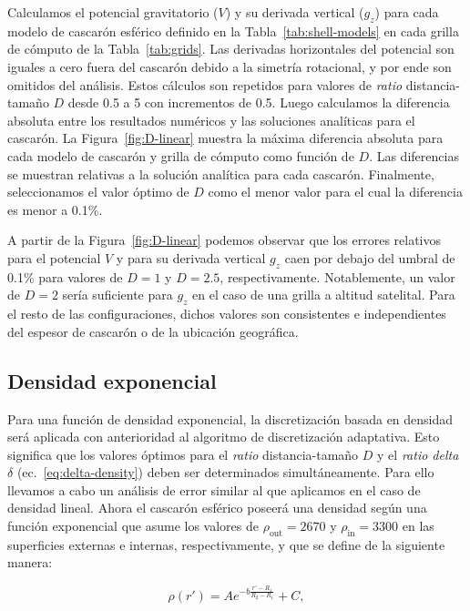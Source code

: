 Calculamos el potencial gravitatorio ($V$) y su derivada vertical ($g_z$)
para cada modelo de cascarón esférico definido en la
Tabla~\ref{tab:shell-models} en cada grilla de cómputo de la
Tabla~\ref{tab:grids}.
Las derivadas horizontales del potencial son iguales a cero fuera del cascarón
debido a la simetría rotacional, y por ende son omitidos del análisis.
Estos cálculos son repetidos para valores de \emph{ratio} distancia-tamaño $D$
desde 0.5 a 5 con incrementos de 0.5.
Luego calculamos la diferencia absoluta entre los resultados numéricos y las
soluciones analíticas para el cascarón.
La Figura~\ref{fig:D-linear} muestra la máxima diferencia absoluta para cada
modelo de cascarón y grilla de cómputo como función de $D$.
Las diferencias se muestran relativas a la solución analítica para cada
cascarón.
Finalmente, seleccionamos el valor óptimo de $D$ como el menor valor para el
cual la diferencia es menor a 0.1\%.

A partir de la Figura~\ref{fig:D-linear} podemos observar que los errores
relativos para el potencial $V$ y para su derivada vertical $g_z$ caen por
debajo del umbral de 0.1\% para valores de $D=1$ y $D=2.5$, respectivamente.
Notablemente, un valor de $D=2$ sería suficiente para $g_z$ en el caso de una
grilla a altitud satelital.
Para el resto de las configuraciones, dichos valores son consistentes
e independientes del espesor de cascarón o de la ubicación geográfica.


\subsection{Densidad exponencial}

Para una función de densidad exponencial, la discretización basada en densidad
será aplicada con anterioridad al algoritmo de discretización adaptativa.
Esto significa que los valores óptimos para el \emph{ratio} distancia-tamaño
$D$ y el \emph{ratio delta} $\delta$ (ec.~\ref{eq:delta-density}) deben ser
determinados simultáneamente.
Para ello llevamos a cabo un análisis de error similar al que aplicamos en el
caso de densidad lineal.
Ahora el cascarón esférico poseerá una densidad según una función exponencial
que asume los valores de $\rho_\text{out} = 2670$\kgpercubicm{}
y $\rho_\text{in} = 3300$\kgpercubicm{} en las superficies externas
e internas, respectivamente, y que se define de la siguiente manera:

\begin{equation}
    \rho(r') = A e^{- b \frac{r' - R_1}{R_2 - R_1}} + C,
    \label{eq:density-exp}
\end{equation}

